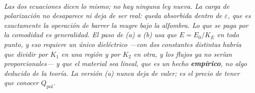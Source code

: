 \begin{center}
\\[0.5em]
{\small\itshape Las dos ecuaciones dicen lo mismo; no hay ninguna ley nueva. La
carga de polarización no desaparece ni deja de ser real: queda absorbida dentro
de $\varepsilon$, que es exactamente la operación de barrer la mugre bajo la
alfombra. Lo que se paga por la comodidad es generalidad. El paso de (a) a (b)
usa que $E = E_0/K_E$ \emph{en todo punto}, y eso requiere un único dieléctrico
---con dos constantes distintas habría que dividir por $K_1$ en una región y por
$K_2$ en otra, y los flujos ya no serían proporcionales--- y que el material sea
lineal, que es un hecho \textbf{empírico}, no algo deducido de la teoría. La
versión (a) nunca deja de valer; es el precio de tener que conocer
$Q_{\text{pol}}$.}
\end{center}
